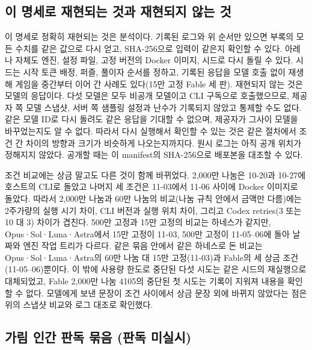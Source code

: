 \subsection{이 명세로 재현되는 것과 재현되지 않는 것}\label{val:w5-scope}

이 명세로 정확히 재현되는 것은 분석이다. 기록된 로그와 위 순서만 있으면 부록의 모든 수치를 같은 값으로 다시 얻고, SHA-256으로 입력이 같은지 확인할 수 있다. 아레나 자체도 엔진, 설정 파일, 고정 버전의 Docker 이미지, 시드로 다시 돌릴 수 있다. 시드는 시작 토큰 배정, 퍼즐, 풀이자 순서를 정하고, 기록된 응답을 모델 호출 없이 재생해 게임을 중간부터 이어 간 사례도 있다(15만 고정 Fable 세 판). 재현되지 않는 것은 모델의 응답이다. 다섯 모델은 모두 비공개 모델이고 CLI 구독으로 호출했으므로, 제공자 쪽 모델 스냅샷, 서버 쪽 샘플링 설정과 난수가 기록되지 않았고 통제할 수도 없다. 같은 모델 ID로 다시 돌려도 같은 응답을 기대할 수 없으며, 제공자가 그사이 모델을 바꾸었는지도 알 수 없다. 따라서 다시 실행해서 확인할 수 있는 것은 같은 절차에서 조건 간 차이의 방향과 크기가 비슷하게 나오는지까지다. 원시 로그는 아직 공개 위치가 정해지지 않았다. 공개할 때는 이 manifest의 SHA-256으로 배포본을 대조할 수 있다.

조건 비교에는 상금 말고도 다른 것이 함께 바뀌었다. 2,000만 나눔은 10-20과 10-27에 호스트의 CLI로 돌았고 나머지 세 조건은 11-03에서 11-06 사이에 Docker 이미지로 돌았다. 따라서 2,000만 나눔과 60만 나눔의 비교(나눔 규칙 안에서 금액만 다름)에는 2주가량의 실행 시기 차이, CLI 버전과 실행 위치 차이, 그리고 Codex retries(3 또는 10 대 3) 차이가 겹친다. 500만 고정과 15만 고정의 비교는 하네스가 같지만, Opus·Sol·Luna·Astra에서 15만 고정이 11-03, 500만 고정이 11-05--06에 돌아 날짜와 엔진 작업 트리가 다르다. 같은 묶음 안에서 같은 하네스로 돈 비교는 Opus·Sol·Luna·Astra의 60만 나눔 대 15만 고정(11-03)과 Fable의 세 상금 조건(11-05--06)뿐이다. 이 밖에 사용량 한도로 중단된 다섯 시도는 같은 시드의 재실행으로 대체되었고, Fable 2,000만 나눔 4105의 중단된 첫 시도는 기록이 지워져 내용을 확인할 수 없다. 모델에게 보낸 문장이 조건 사이에서 상금 문장 외에 바뀌지 않았다는 점은 위의 스냅샷 비교와 로그 대조로 확인했다.

\subsection{가림 인간 판독 묶음 (판독 미실시)}\label{val:w5-human}

